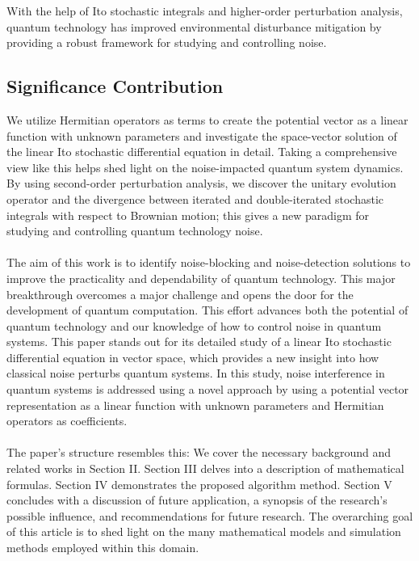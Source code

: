 \documentclass[journal,twocolumn]{IEEEtran}
\begin{document}
With the help of Ito stochastic integrals and higher-order perturbation analysis, quantum technology has improved environmental disturbance mitigation by providing a robust framework for studying and controlling noise.

\subsection{ Significance Contribution}
We utilize Hermitian operators as terms to create the potential vector as a linear function with unknown parameters and investigate the space-vector solution of the linear Ito stochastic differential equation in detail. Taking a comprehensive view like this helps shed light on the noise-impacted quantum system dynamics. By using second-order perturbation analysis, we discover the unitary evolution operator and the divergence between iterated and double-iterated stochastic integrals with respect to Brownian motion; this gives a new paradigm for studying and controlling quantum technology noise.\\
\\The aim of this work is to identify noise-blocking and noise-detection solutions to improve the practicality and dependability of quantum technology. This major breakthrough overcomes a major challenge and opens the door for the development of quantum computation. This effort advances both the potential of quantum technology and our knowledge of how to control noise in quantum systems. This paper stands out for its detailed study of a linear Ito stochastic differential equation in vector space, which provides a new insight into how classical noise perturbs quantum systems. In this study, noise interference in quantum systems is addressed using a novel approach by using a potential vector representation as a linear function with unknown parameters and Hermitian operators as coefficients.\\\\
The paper's structure resembles this: We cover the necessary background and related works in Section II. Section III delves into a description of mathematical formulas. Section IV demonstrates the proposed algorithm method. Section V concludes with a discussion of future application, a synopsis of the research's possible influence, and recommendations for future research. The overarching goal of this article is to shed light on the many mathematical models and simulation methods employed within this domain.
\end{document}
